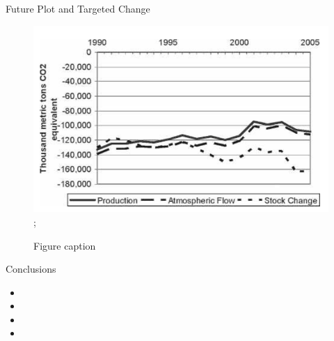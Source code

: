\documentclass[final]{beamer}\usepackage[]{graphicx}\usepackage[]{color}
\newlength{\onecolwid}
\begin{document}
\begin{frame}[t]
\begin{columns}[t]
\begin{column}{\onecolwid} %


\begin{block}{Future Plot and Targeted Change}
\begin{center}

\begin{figure}
    {\includegraphics[width=1\linewidth]{graph1.png}};
    \caption{Figure caption}
\end{figure}
\end{center}

\end{block}


\begin{block}{Conclusions}

\begin{itemize}
\item 
\item 
\item 
\item
\end{itemize}

\end{block}



\end{column}
\end{columns}
\end{frame}
\end{document}
